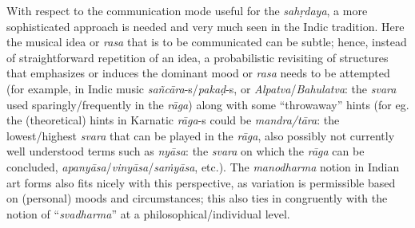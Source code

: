 With respect to the communication mode useful for the \textsl{sahṛdaya}, a more sophisticated approach is needed and very much seen in the Indic tradition. Here the musical idea or \textsl{rasa} that is to be communicated can be subtle; hence, instead of straightforward repetition of an idea, a probabilistic revisiting of structures that emphasizes or induces the dominant mood or \textsl{rasa} needs to be attempted (for example, in Indic music \textsl{sañcāra}-s/\textsl{pakaḍ}-s, or \textsl{Alpatva}/\textsl{Bahulatva}: the \textsl{svara} used sparingly/frequently in the \textsl{rāga}) along with some “throwaway” hints (for eg. the (theoretical) hints in Karnatic \textsl{rāga}-s could be \textsl{mandra/tāra}: the lowest/highest \textsl{svara} that can be played in the \textsl{rāga}, also possibly not currently well understood terms such as \textsl{nyāsa}: the \textsl{svara} on which the \textsl{rāga} can be concluded, \textsl{apanyāsa}/\textsl{vinyāsa}/\textsl{saṁyāsa}, etc.). The \textsl{manodharma} notion in Indian art forms also fits nicely with this perspective, as variation is permissible based on (personal) moods and circumstances; this also ties in congruently with the notion of “\textsl{svadharma}” at a philosophical/individual level.

